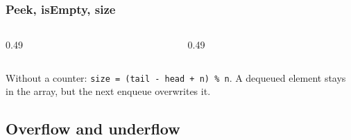 \documentclass[aspectratio=169,10pt,compress]{beamer}
\begin{document}
\begin{frame}[t,fragile] \frametitle{Peek, isEmpty, size}
  \begin{columns}[T]
    \begin{column}{0.49\textwidth}
      \SetAlFnt{\small}


\begin{algorithm}[H]
  \caption{Peek}
  \;
\end{algorithm}

    \end{column}
    \begin{column}{0.49\textwidth}
      \SetAlFnt{\small}


\begin{algorithm}[H]
  \caption{IsEmpty and Size}
\end{algorithm}

    \end{column}
  \end{columns}
  \vspace{0.3em}
  \small Without a counter: \texttt{size = (tail - head + n) \% n}. A dequeued element stays in the array, but the next enqueue overwrites it.
\end{frame}

\subsection[Errors]{Overflow and underflow}
\end{document}
